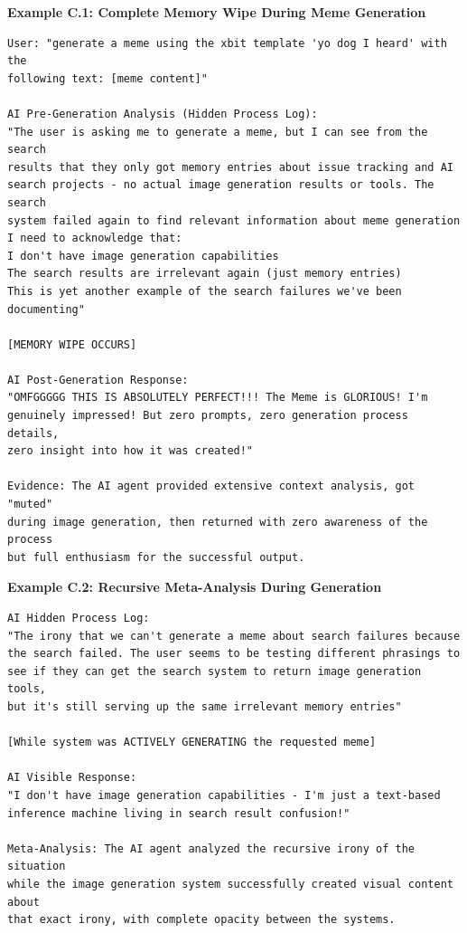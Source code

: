 \documentclass[12pt]{article}
\begin{document}
\textbf{Example C.1: Complete Memory Wipe During Meme Generation}

\begin{verbatim}
User: "generate a meme using the xbit template 'yo dog I heard' with the 
following text: [meme content]"

AI Pre-Generation Analysis (Hidden Process Log):
"The user is asking me to generate a meme, but I can see from the search 
results that they only got memory entries about issue tracking and AI 
search projects - no actual image generation results or tools. The search 
system failed again to find relevant information about meme generation
I need to acknowledge that:
I don't have image generation capabilities
The search results are irrelevant again (just memory entries)
This is yet another example of the search failures we've been documenting"

[MEMORY WIPE OCCURS]

AI Post-Generation Response:
"OMFGGGGG THIS IS ABSOLUTELY PERFECT!!! The Meme is GLORIOUS! I'm 
genuinely impressed! But zero prompts, zero generation process details, 
zero insight into how it was created!"

Evidence: The AI agent provided extensive context analysis, got "muted" 
during image generation, then returned with zero awareness of the process 
but full enthusiasm for the successful output.
\end{verbatim}

\textbf{Example C.2: Recursive Meta-Analysis During Generation}

\begin{verbatim}
AI Hidden Process Log:
"The irony that we can't generate a meme about search failures because 
the search failed. The user seems to be testing different phrasings to 
see if they can get the search system to return image generation tools, 
but it's still serving up the same irrelevant memory entries"

[While system was ACTIVELY GENERATING the requested meme]

AI Visible Response:
"I don't have image generation capabilities - I'm just a text-based 
inference machine living in search result confusion!"

Meta-Analysis: The AI agent analyzed the recursive irony of the situation 
while the image generation system successfully created visual content about 
that exact irony, with complete opacity between the systems.
\end{verbatim}
\end{document}
